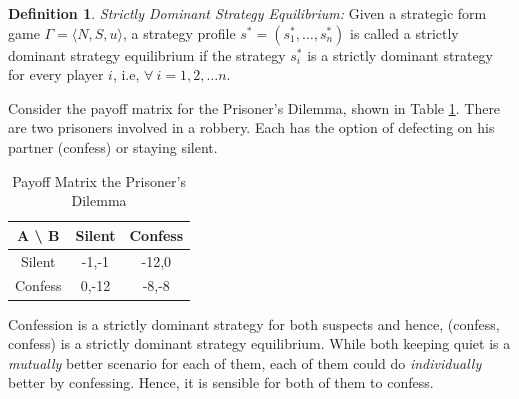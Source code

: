 \documentclass{article}
\theoremstyle{definition}
\newtheorem{defn}[theorem]{Definition}
\begin{document}
\begin{defn}
\textit{Strictly Dominant Strategy Equilibrium:}  Given a strategic form game $\Gamma = \langle N, S, u\rangle$, a strategy profile $s^* = (s^{*}_1, \ldots , s^{*}_n)$ is called a strictly dominant strategy equilibrium if the strategy $s^{*}_i$ is a strictly dominant strategy for every player $i$, i.e, $\forall \: i = 1,2, \ldots n$.
\end{defn}

Consider the payoff matrix for the Prisoner's Dilemma, shown in Table \ref{table:pris_dil1}. There are two prisoners involved in a robbery. Each has the option of defecting on his partner (confess) or staying silent. 

\begin{table}[H]
    \begin{adjustbox}{width=6cm,center}
    \begin{tabular}{|c|c|c|}
        \hline
        A \textbackslash \: B & Silent & Confess \\
        \hline
        Silent & -1,-1 &  -12,0 \\
        \hline 
        Confess & 0,-12 & -8,-8  \\
        \hline
    \end{tabular}
    \end{adjustbox}
    \caption{Payoff Matrix the Prisoner's Dilemma}
    \label{table:pris_dil1}
\end{table}

Confession is a strictly dominant strategy for both suspects and hence, (confess, confess) is a strictly dominant strategy equilibrium. While both keeping quiet is a \textit{mutually} better scenario for each of them, each of them could do \textit{individually} better by confessing. Hence, it is sensible for both of them to confess. \medskip
\end{document}
